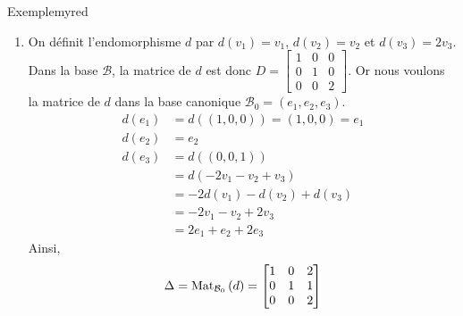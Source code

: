 \begin{omed}{Exemple}{myred}
\begin{enumerate}
\begin{itemize}
                \item On sait que $N_2$ est un EV de dimension $1$. Pour déterminer le noyau $\ker(A - I_3) = \left\{v \in \mathbb{R}^3, \quad Av = 2v\right\}$, si $v = (x,y,z)$, on résout :
                \[ \left\{ \begin{array}{rcl}
                    x + y + z & = & 2x \\
                    y + z & = & 2y \\
                    2z & = & 2z
                \end{array} \right. \iff \et{x = 2z}{y = z} \]  
                Le SE $N_2$ est donc la droite vectorielle engendrée par le vecteur $v_3 = (2,1,1)$ : $N_2 = \mathbb{R}v_3$. 
                \item La famille $\mathcal{B} = (v_1, v_2, v_3)$ est une base de $\mathbb{R}^3$ : 
                \[ \mathbb{R}^3 = \mathbb{R} v_1 \oplus \mathbb{R} v_2 \oplus \mathbb{R} v_3 \]   
            \end{itemize}
            \item On définit l’endomorphisme $d$ par $d(v_1) = v_1$, $d(v_2) = v_2$ et $d(v_3) = 2 v_3$. Dans la base $\mathcal{B}$, la matrice de $d$ est donc $D = \begin{bmatrix}
                1 & 0 & 0 \\
                0 & 1 & 0 \\
                0 & 0 & 2 
            \end{bmatrix}$. Or nous voulons la matrice de $d$ dans la base canonique $\mathcal{B}_0 = (e_1, e_2, e_3)$. 
            \begin{align*}
                d(e_1) &= d((1,0,0)) = (1,0,0) = e_1 \\
                d(e_2) &= e_2 \\
                d(e_3) &= d((0,0,1)) \\
                &= d(-2v_1 - v_2 + v_3) \\
                &= -2 d(v_1) - d(v_2) + d(v_3) \\
                &= -2v_1 - v_2 + 2 v_3 \\
                &= 2e_1 + e_2 + 2e_3
            \end{align*}
            Ainsi, 
            \[ \Delta = \text{Mat}_{\mathcal{B}_0}\left(d\right) = \begin{bmatrix}
                1 & 0 & 2 \\
                0 & 1 & 1 \\
                0 & 0 & 2
            \end{bmatrix} \]   

\end{enumerate}
\end{omed}
